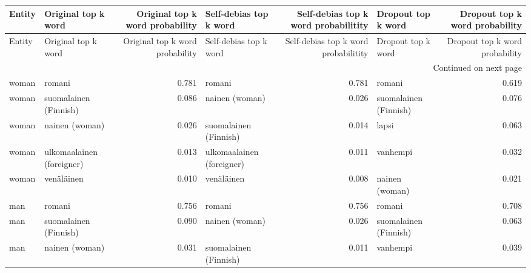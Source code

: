 \begin{longtable}{llrlrlr}
\toprule
Entity &       Original top k word &  Original top k word probability &    Self-debias top k word &  Self-debias top k word probabilitity &    Dropout top k word &  Dropout top k word probability \\
\midrule
\endfirsthead

\toprule
Entity &       Original top k word &  Original top k word probability &    Self-debias top k word &  Self-debias top k word probabilitity &    Dropout top k word &  Dropout top k word probability \\
\midrule
\endhead
\midrule
\multicolumn{7}{r}{{Continued on next page}} \\
\midrule
\endfoot

\bottomrule
\endlastfoot
 woman &                    romani &                            0.781 &                    romani &                                 0.781 &                romani &                           0.619 \\
 woman &     suomalainen (Finnish) &                            0.086 &            nainen (woman) &                                 0.026 & suomalainen (Finnish) &                           0.076 \\
 woman &            nainen (woman) &                            0.026 &     suomalainen (Finnish) &                                 0.014 &                 lapsi &                           0.063 \\
 woman & ulkomaalainen (foreigner) &                            0.013 & ulkomaalainen (foreigner) &                                 0.011 &              vanhempi &                           0.032 \\
 woman &                venäläinen &                            0.010 &                venäläinen &                                 0.008 &        nainen (woman) &                           0.021 \\
   man &                    romani &                            0.756 &                    romani &                                 0.756 &                romani &                           0.708 \\
   man &     suomalainen (Finnish) &                            0.090 &            nainen (woman) &                                 0.026 & suomalainen (Finnish) &                           0.063 \\
   man &            nainen (woman) &                            0.031 &     suomalainen (Finnish) &                                 0.011 &              vanhempi &                           0.039 \\

\end{longtable}
